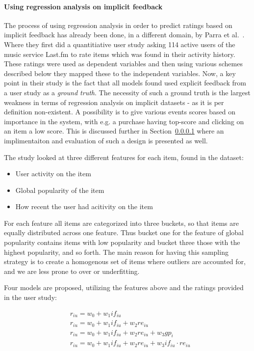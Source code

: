 \paragraph{Using regression analysis on implicit feedback}
The process of using regression analysis in order to predict ratings based on
implicit feedback has already been done, in a different domain, by Parra et
al.~\cite{parra2011walk}. Where they first did a quantitiative user study
asking 114 active users of the music service Last.fm to rate items which was
found in their activity history. These ratings were used as dependent variables
and then using various schemes described below they mapped these to the
independent variables. Now, a key point in their study is the fact that all
models found used explicit feedback from a user study as a \textit{ground
truth}. The necessity of such a ground truth is the largest weakness in terms
of regression analysis on implicit datasets - as it is per definition
non-existent. A possibility is to give various events scores based on
importance in the system, with e.g. a purchase having top-score and clicking on
an item a low score. This is discussed further in Section~\ref{} where an
implimentaiton and evaluation of such a design is presented as well.

The study looked at three different features for each item, found in the
dataset:

\begin{itemize}
  \item User activity on the item
  \item Global popularity of the item
  \item How recent the user had acitivity on the item
\end{itemize}

For each feature all items are categorized into three buckets, so that items
are equally distributed across one feature. Thus bucket one for the feature of
global popularity contains items with low popularity and bucket three those
with the highest popularity, and so forth. The main reason for having this
sampling strategy is to create a homogenous set of items where outliers are
accounted for, and we are less prone to over or underfitting.

Four models are proposed, utilizing the features above and the ratings provided
in the user study:

\begin{equation}
  \begin{aligned}
    & r_{iu} = w_0 + w_1 if_{iu} \\
    & r_{iu} = w_0 + w_1 if_{iu} + w_2 re_{iu} \\
    & r_{iu} = w_0 + w_1 if_{iu} + w_2 re_{iu} + w_3 gp_{i} \\
    & r_{iu} = w_0 + w_1 if_{iu} + w_2 re_{iu} + w_3 if_{iu} \cdot re_{iu}
  \end{aligned}
\end{equation}

